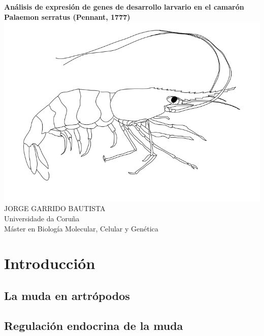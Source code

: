 \documentclass[a4paper]{article}
\begin{document}
\begin{titlepage}
\begin{center}
\vspace*{5\baselineskip} %
{\LARGE \textbf{Análisis de expresión de genes de desarrollo larvario en el camarón Palaemon serratus (Pennant, 1777)}}
\vspace*{5\baselineskip}
\includegraphics[scale=0.4]{Figura portada (Wikipedia).png}
\vfill %
{\large JORGE GARRIDO BAUTISTA}\\
Universidade da Coruña\\
Máster en Biología Molecular, Celular y Genética
\end{center}
\end{titlepage}

\section{Introducción}
\subsection{La muda en artrópodos}
\subsection{Regulación endocrina de la muda}
\end{document}
